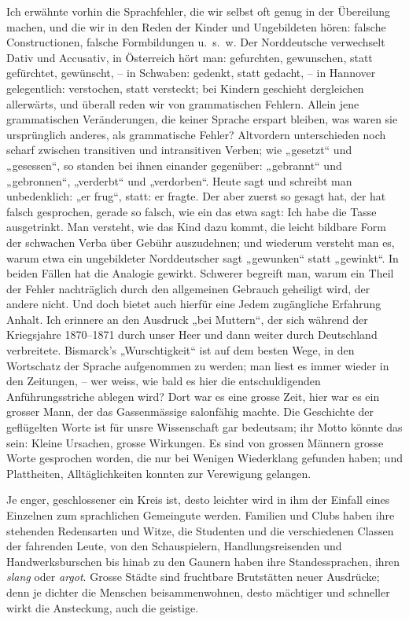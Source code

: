 Ich erwähnte vorhin die Sprachfehler, die wir selbst oft genug in der Übereilung machen, und die wir in den Reden der Kinder und Ungebildeten hören: falsche Constructionen, falsche Formbildungen u.~s.~w. Der Norddeutsche verwechselt Dativ und Accusativ, in Österreich hört \label{fp.45} man: gefurchten, gewunschen, statt gefürchtet, gewünscht, – in Schwaben: gedenkt, statt gedacht, – in Hannover gelegentlich: verstochen, statt versteckt; bei Kindern geschieht dergleichen allerwärts, und überall reden wir von grammatischen Fehlern. Allein jene grammatischen Veränderungen, die keiner Sprache erspart bleiben, was waren sie ursprünglich anderes, als grammatische Fehler?  Altvordern unterschieden noch scharf zwischen transitiven und intransitiven Verben; wie „gesetzt“ und „gesessen“, so standen bei ihnen einander gegenüber: „gebrannt“ und „gebronnen“, „verderbt“ und „verdorben“. Heute sagt und schreibt man unbedenklich: „er frug“, statt: er fragte. Der aber zuerst so gesagt hat, der hat falsch gesprochen, gerade so falsch, wie ein  das etwa sagt: Ich habe \label{sp.45} die Tasse ausgetrinkt. Man versteht, wie das Kind dazu kommt, die leicht bildbare Form der schwachen Verba über Gebühr auszudehnen; und wiederum versteht man es, warum etwa ein ungebildeter Norddeutscher sagt „gewunken“ statt „gewinkt“. In beiden Fällen hat die Analogie gewirkt. Schwerer begreift man, warum ein Theil der Fehler nachträglich durch den allgemeinen Gebrauch geheiligt wird, der andere nicht. Und doch bietet auch hierfür eine Jedem zugängliche Erfahrung Anhalt. Ich erinnere an den Ausdruck „bei Muttern“, der sich während der Kriegsjahre 1870–1871 durch unser Heer und dann weiter durch Deutschland verbreitete. Bismarck’s „Wurschtigkeit“ ist auf dem besten Wege, in den Wortschatz der Sprache aufgenommen zu werden; man liest es immer wieder in den Zeitungen, – wer weiss, wie bald es hier die entschuldigenden Anführungsstriche ablegen wird? Dort war es eine grosse Zeit, hier war es ein grosser Mann, der das Gassenmässige salonfähig machte. Die Geschichte der geflügelten Worte ist für unsre Wissenschaft gar bedeutsam; ihr Motto könnte das  sein: Kleine Ursachen, grosse Wirkungen. Es sind von grossen Männern grosse Worte gesprochen worden, die nur bei Wenigen Wiederklang gefunden haben; und Plattheiten, Alltäglichkeiten konnten zur Verewigung gelangen.

Je enger, geschlossener ein Kreis ist, desto leichter wird in ihm der Einfall eines Einzelnen zum sprachlichen Gemeingute werden. Familien und Clubs haben ihre stehenden Redensarten und Witze, die Studenten und die verschiedenen Classen der fahrenden Leute, von den Schauspielern, Handlungsreisenden und Handwerksburschen bis hinab zu den Gaunern haben ihre Standessprachen, ihren \textit{slang} oder \textit{argot}. Grosse \label{fp.46} Städte sind fruchtbare Brutstätten neuer Ausdrücke; denn je dichter die Menschen beisammenwohnen, desto mächtiger und schneller wirkt die Ansteckung, auch die geistige.

